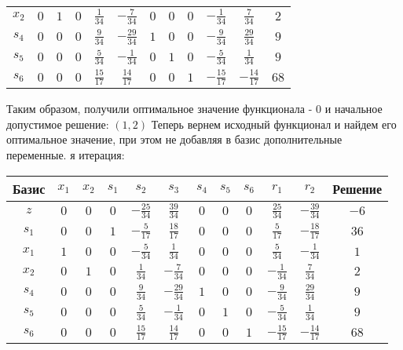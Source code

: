 \documentclass{article}%
\begin{document}
\begin{flushleft}
\begin{tabular}{|c|cccccccccc|c|}
$x_{2}$&$0$&$1$&$0$&$\frac{1}{34}$&$-\frac{7}{34}$&$0$&$0$&$0$&$-\frac{1}{34}$&$\frac{7}{34}$&$2$\\%
$s_{4}$&$0$&$0$&$0$&$\frac{9}{34}$&$-\frac{29}{34}$&$1$&$0$&$0$&$-\frac{9}{34}$&$\frac{29}{34}$&$9$\\%
$s_{5}$&$0$&$0$&$0$&$\frac{5}{34}$&$-\frac{1}{34}$&$0$&$1$&$0$&$-\frac{5}{34}$&$\frac{1}{34}$&$9$\\%
$s_{6}$&$0$&$0$&$0$&$\frac{15}{17}$&$\frac{14}{17}$&$0$&$0$&$1$&$-\frac{15}{17}$&$-\frac{14}{17}$&$68$\\%
\hline%
\end{tabular}%
\newline%
\newline%
Таким образом, получили оптимальное значение функционала {-} 0 и начальное допустимое решение: %
$(1, 2)$%
\newline%
Теперь вернем исходный функционал и найдем его оптимальное значение, при этом не добавляя в базис дополнительные переменные.%
я итерация: %
\newline%
\newline%
\renewcommand{\arraystretch}{1.3}%
\begin{tabular}{|c|cccccccccc|c|}%
\hline%
Базис&$x_{1}$&$x_{2}$&$s_{1}$&$s_{2}$&$s_{3}$&$s_{4}$&$s_{5}$&$s_{6}$&$r_{1}$&$r_{2}$&Решение\\%
\hline%
$z$&$0$&$0$&$0$&$-\frac{25}{34}$&$\frac{39}{34}$&$0$&$0$&$0$&$\frac{25}{34}$&$-\frac{39}{34}$&$-6$\\%
\hline%
$s_{1}$&$0$&$0$&$1$&$-\frac{5}{17}$&$\frac{18}{17}$&$0$&$0$&$0$&$\frac{5}{17}$&$-\frac{18}{17}$&$36$\\%
$x_{1}$&$1$&$0$&$0$&$-\frac{5}{34}$&$\frac{1}{34}$&$0$&$0$&$0$&$\frac{5}{34}$&$-\frac{1}{34}$&$1$\\%
$x_{2}$&$0$&$1$&$0$&$\frac{1}{34}$&$-\frac{7}{34}$&$0$&$0$&$0$&$-\frac{1}{34}$&$\frac{7}{34}$&$2$\\%
$s_{4}$&$0$&$0$&$0$&$\frac{9}{34}$&$-\frac{29}{34}$&$1$&$0$&$0$&$-\frac{9}{34}$&$\frac{29}{34}$&$9$\\%
$s_{5}$&$0$&$0$&$0$&$\frac{5}{34}$&$-\frac{1}{34}$&$0$&$1$&$0$&$-\frac{5}{34}$&$\frac{1}{34}$&$9$\\%
$s_{6}$&$0$&$0$&$0$&$\frac{15}{17}$&$\frac{14}{17}$&$0$&$0$&$1$&$-\frac{15}{17}$&$-\frac{14}{17}$&$68$\\%
\hline%
\end{tabular}%
\newline%
\newline%

\end{flushleft}
\end{document}
